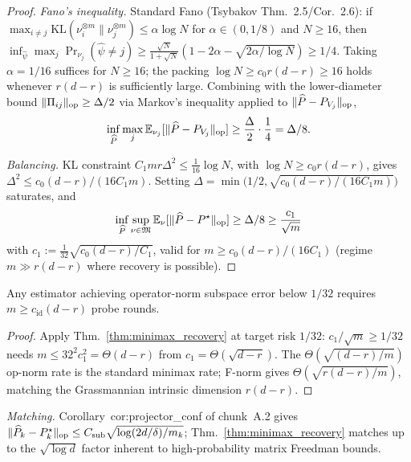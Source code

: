 \begin{proof}
\emph{Fano's inequality.} Standard Fano (Tsybakov Thm.~2.5/Cor.~2.6):
if $\max_{i\ne j}\mathrm{KL}(\nu_i^{\otimes m}\|\nu_j^{\otimes m})\le\alpha\log N$
for $\alpha\in(0,1/8)$ and $N\ge 16$, then
$\inf_{\widehat\psi}\max_j\Pr_{\nu_j}(\widehat\psi\ne j)
\ge\tfrac{\sqrt N}{1+\sqrt N}(1-2\alpha-\sqrt{2\alpha/\log N})\ge 1/4$.
Taking $\alpha=1/16$ suffices for $N\ge 16$; the packing
$\log N\ge c_0 r(d-r)\ge 16$ holds whenever $r(d-r)$ is sufficiently large.
Combining with the lower-diameter bound $\|\Pi_{ij}\|_{\mathrm{op}}\ge\Delta/2$
via Markov's inequality applied to $\|\widehat P-P_{V_j}\|_{\mathrm{op}}$,
\[
\inf_{\widehat P}\max_j\mathbb{E}_{\nu_j}[\|\widehat P-P_{V_j}\|_{\mathrm{op}}]
\ge\frac{\Delta}{2}\cdot\frac{1}{4}=\Delta/8.
\]

\emph{Balancing.} KL constraint $C_1 m r\Delta^2\le\tfrac{1}{16}\log N$,
with $\log N\ge c_0 r(d-r)$, gives $\Delta^2\le c_0(d-r)/(16C_1 m)$.
Setting $\Delta=\min\bigl(1/2,\sqrt{c_0(d-r)/(16C_1 m)}\bigr)$ saturates,
and
\[
\inf_{\widehat P}\sup_{\nu\in\mathfrak M}\mathbb{E}_\nu[\|\widehat P-P^\star\|_{\mathrm{op}}]
\ge\Delta/8\ge\frac{c_1}{\sqrt m}
\]
with $c_1:=\tfrac{1}{32}\sqrt{c_0(d-r)/C_1}$, valid for
$m\ge c_0(d-r)/(16C_1)$ (regime $m\gg r(d-r)$ where recovery is possible).
\end{proof}

\begin{corollary}
\label{cor:id_threshold_conf}
Any estimator achieving operator-norm subspace error below $1/32$
requires $m\ge c_{\mathrm{id}}(d-r)$ probe rounds.
\end{corollary}
\begin{proof}
Apply Thm.~\ref{thm:minimax_recovery} at target risk $1/32$:
$c_1/\sqrt m\ge 1/32$ needs $m\le 32^2 c_1^2=\Theta(d-r)$ from
$c_1=\Theta(\sqrt{d-r})$. The $\Theta(\sqrt{(d-r)/m})$ op-norm rate is
the standard minimax rate; F-norm gives $\Theta(\sqrt{r(d-r)/m})$,
matching the Grassmannian intrinsic dimension $r(d-r)$.
\end{proof}

\emph{Matching.} Corollary~cor:projector\_conf of chunk~A.2 gives
$\|\widehat P_k-P_k^\star\|_{\mathrm{op}}\le C_{\mathrm{sub}}\sqrt{\log(2d/\delta)/m_k}$;
Thm.~\ref{thm:minimax_recovery} matches up to the $\sqrt{\log d}$
factor inherent to high-probability matrix Freedman bounds.


